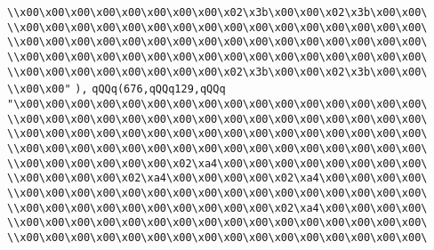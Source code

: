 \verb|\\x00\x00\x00\x00\x00\x00\x00\x00\x02\x3b\x00\x00\x02\x3b\x00\x00\|\newline
\verb|\\x00\x00\x00\x00\x00\x00\x00\x00\x00\x00\x00\x00\x00\x00\x00\x00\|\newline
\verb|\\x00\x00\x00\x00\x00\x00\x00\x00\x00\x00\x00\x00\x00\x00\x00\x00\|\newline
\verb|\\x00\x00\x00\x00\x00\x00\x00\x00\x00\x00\x00\x00\x00\x00\x00\x00\|\newline
\verb|\\x00\x00\x00\x00\x00\x00\x00\x00\x02\x3b\x00\x00\x02\x3b\x00\x00\|\newline
\verb|\\x00\x00"|\newline
\verb|),|\newline
\verb|qQQq(676,qQQq129,qQQq|\newline
\verb|"\x00\x00\x00\x00\x00\x00\x00\x00\x00\x00\x00\x00\x00\x00\x00\x00\|\newline
\verb|\\x00\x00\x00\x00\x00\x00\x00\x00\x00\x00\x00\x00\x00\x00\x00\x00\|\newline
\verb|\\x00\x00\x00\x00\x00\x00\x00\x00\x00\x00\x00\x00\x00\x00\x00\x00\|\newline
\verb|\\x00\x00\x00\x00\x00\x00\x00\x00\x00\x00\x00\x00\x00\x00\x00\x00\|\newline
\verb|\\x00\x00\x00\x00\x00\x00\x02\xa4\x00\x00\x00\x00\x00\x00\x00\x00\|\newline
\verb|\\x00\x00\x00\x00\x02\xa4\x00\x00\x00\x00\x02\xa4\x00\x00\x00\x00\|\newline
\verb|\\x00\x00\x00\x00\x00\x00\x00\x00\x00\x00\x00\x00\x00\x00\x00\x00\|\newline
\verb|\\x00\x00\x00\x00\x00\x00\x00\x00\x00\x00\x02\xa4\x00\x00\x00\x00\|\newline
\verb|\\x00\x00\x00\x00\x00\x00\x00\x00\x00\x00\x00\x00\x00\x00\x00\x00\|\newline
\verb|\\x00\x00\x00\x00\x00\x00\x00\x00\x00\x00\x00\x00\x00\x00\x00\x00\|\newline

